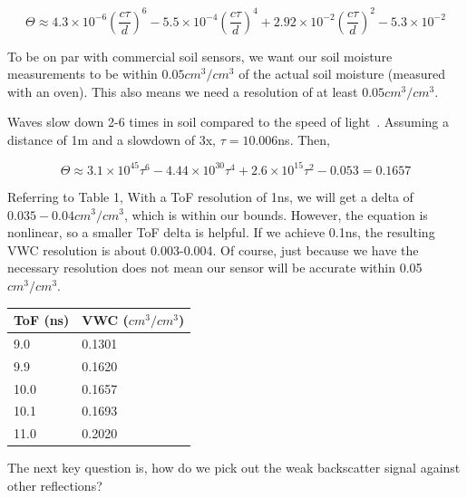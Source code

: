 \documentclass[12pt]{article}
\begin{document}
\begin{equation}
  \Theta \approx 4.3\times 10^{-6} (\frac{c\tau}{d})^6-5.5\times10^{-4} (\frac{c\tau}{d})^4+2.92\times 10^{-2} (\frac{c\tau}{d})^2-5.3\times 10^{-2}
\end{equation}

To be on par with commercial soil sensors, we want our soil moisture
measurements to be within $0.05 cm^3/cm^3$ of the actual soil moisture
(measured with an oven). This also means we need a resolution of at
least $0.05 cm^3/cm^3$.

Waves slow down 2-6 times in soil compared to the speed of
light~\cite{gpr}. Assuming a distance of 1m and a slowdown of 3x,
$\tau = 10.006$ns. Then,

\begin{equation}
  \Theta \approx 3.1\times 10^{45}\tau^6-4.44\times 10^{30}\tau^4+2.6\times 10^{15}\tau^2-0.053 = 0.1657
\end{equation}

Referring to Table 1, With a ToF resolution of 1ns, we will get a
delta of $0.035-0.04 cm^3/cm^3$, which is within our bounds. However,
the equation is nonlinear, so a smaller ToF delta is helpful. If we
achieve 0.1ns, the resulting VWC resolution is about 0.003-0.004. Of
course, just because we have the necessary resolution does not mean
our sensor will be accurate within 0.05$cm^3/cm^3$.


\begin{table}[]
  \centering
\begin{tabular}{l|l}
\textbf{ToF (ns)} & \textbf{VWC ($cm^3/cm^3$)} \\ \hline
9.0               & 0.1301                                                      \\
9.9              & 0.1620                                                       \\
  10.0              & 0.1657                                                       \\
10.1              & 0.1693                                                       \\
11.0              & 0.2020                                                      
\end{tabular}
\end{table}

The next key question is, how do we pick out the weak backscatter
signal against other reflections?
\end{document}
